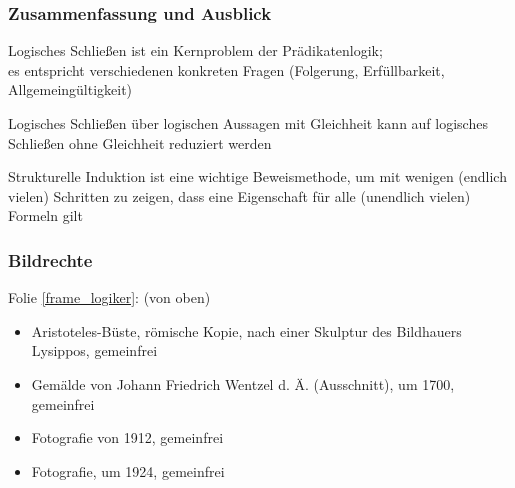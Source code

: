 \documentclass[aspectratio=1610,onlymath]{beamer}
\begin{document}
\begin{frame}\frametitle{Zusammenfassung und Ausblick}

Logisches Schließen ist ein Kernproblem der Prädikatenlogik;\\
es entspricht verschiedenen konkreten Fragen (Folgerung, Erfüllbarkeit, Allgemeingültigkeit)
\bigskip

Logisches Schließen über logischen Aussagen mit Gleichheit kann
auf logisches Schließen ohne Gleichheit reduziert werden\bigskip

Strukturelle Induktion ist eine wichtige Beweismethode, um mit wenigen (endlich vielen) Schritten zu zeigen, dass eine Eigenschaft für alle (unendlich vielen) Formeln gilt\bigskip



\end{frame}




\begin{frame}[t]\frametitle{Bildrechte}

Folie \ref{frame_logiker}: (von oben)
\begin{itemize}
\item Aristoteles-Büste, römische Kopie, nach einer Skulptur des Bildhauers Lysippos, gemeinfrei
\item Gemälde von Johann Friedrich Wentzel d. Ä. (Ausschnitt), um 1700, gemeinfrei
\item Fotografie von 1912, gemeinfrei
\item Fotografie, um 1924, gemeinfrei
\end{itemize}

\end{frame}
\end{document}
